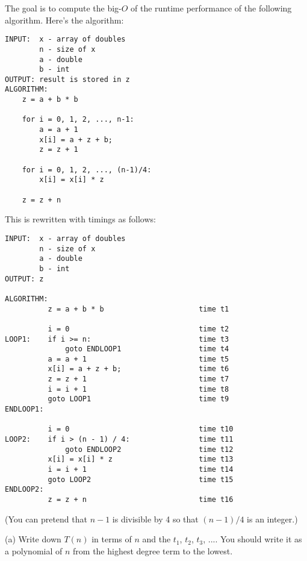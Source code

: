 The goal is to compute the big-$O$ of the runtime performance
of the following algorithm. 
Here's the algorithm:
\begin{Verbatim}[frame=single]
INPUT:  x - array of doubles
        n - size of x
        a - double
        b - int
OUTPUT: result is stored in z
ALGORITHM:
    z = a + b * b                          

    for i = 0, 1, 2, ..., n-1:
        a = a + 1                          
        x[i] = a + z + b;                  
        z = z + 1                          

    for i = 0, 1, 2, ..., (n-1)/4:
        x[i] = x[i] * z                    

    z = z + n                              
\end{Verbatim}
This is rewritten with timings as follows:
\begin{Verbatim}[frame=single]
INPUT:  x - array of doubles
        n - size of x
        a - double
        b - int
OUTPUT: z

ALGORITHM:
          z = a + b * b                      time t1

          i = 0                              time t2
LOOP1:    if i >= n:                         time t3
              goto ENDLOOP1                  time t4 
          a = a + 1                          time t5
          x[i] = a + z + b;                  time t6
          z = z + 1                          time t7
          i = i + 1                          time t8
          goto LOOP1                         time t9
ENDLOOP1:

          i = 0                              time t10
LOOP2:    if i > (n - 1) / 4:                time t11
              goto ENDLOOP2                  time t12
          x[i] = x[i] * z                    time t13
          i = i + 1                          time t14
          goto LOOP2                         time t15
ENDLOOP2:
          z = z + n                          time t16   
\end{Verbatim}

(You can pretend that $n - 1$ is divisible by 4 so that
$(n - 1)/4$ is an integer.)

(a) Write down $T(n)$ in terms of $n$ and the 
$t_1$, $t_2$, $t_3$, ....
You should write it as a polynomial of $n$ from the highest
degree term to the lowest.

